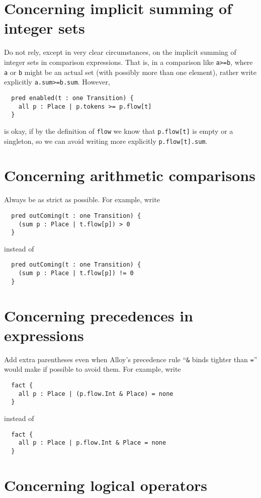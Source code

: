 \documentclass{article}
\begin{document}
\section*{Concerning implicit summing of integer sets}

Do not rely, except in very clear circumstances, on the implicit summing of integer sets in comparison expressions.
That is, in a comparison like \lstinline|a>=b|, where \lstinline|a| or \lstinline|b| might be an actual set (with possibly more than one element), rather write explicitly \lstinline|a.sum>=b.sum|.
However,
\begin{lstlisting}
  pred enabled(t : one Transition) {
    all p : Place | p.tokens >= p.flow[t]
  }
\end{lstlisting}
is okay, if by the definition of \lstinline|flow| we know that \lstinline|p.flow[t]| is empty or a singleton, so we can avoid writing more explicitly \lstinline|p.flow[t].sum|.

\section*{Concerning arithmetic comparisons}

Always be as strict as possible.
For example, write
\begin{lstlisting}
  pred outComing(t : one Transition) {
    (sum p : Place | t.flow[p]) > 0
  }
\end{lstlisting}
instead of
\begin{lstlisting}
  pred outComing(t : one Transition) {
    (sum p : Place | t.flow[p]) != 0
  }
\end{lstlisting}

\section*{Concerning precedences in expressions}

Add extra parentheses even when Alloy's precedence rule ``\lstinline|&| binds tighter than \lstinline|=|'' would make if possible to avoid them.
For example, write
\begin{lstlisting}
  fact {
    all p : Place | (p.flow.Int & Place) = none
  }
\end{lstlisting}
instead of
\begin{lstlisting}
  fact {
    all p : Place | p.flow.Int & Place = none
  }
\end{lstlisting}

\section*{Concerning logical operators}
\end{document}
